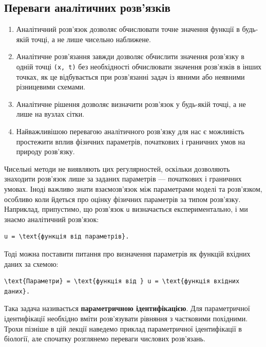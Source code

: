 \documentclass[
  ukrainian,
]{article}
\begin{document}
\subsection{Переваги аналітичних
розв'язків}\label{ux43fux435ux440ux435ux432ux430ux433ux438-ux430ux43dux430ux43bux456ux442ux438ux447ux43dux438ux445-ux440ux43eux437ux432ux44fux437ux43aux456ux432}

\begin{enumerate}
\def\labelenumi{\arabic{enumi}.}
\item
  Аналітичний розв'язок дозволяє обчислювати точне значення функції в
  будь-якій точці, а не лише чисельно наближене.
\item
  Аналітичне розв'язання завжди дозволяє обчислити значення розв'язку в
  одній точці \texttt{(x,\ t)} без необхідності обчислювати значення
  розв'язків в інших точках, як це відбувається при розв'язанні задач із
  явними або неявними різницевими схемами.
\item
  Аналітичне рішення дозволяє визначити розв'язок у будь-якій точці, а
  не лише на вузлах сітки.
\item
  Найважливішою перевагою аналітичного розв'язку для нас є можливість
  простежити вплив фізичних параметрів, початкових і граничних умов на
  природу розв'язку.
\end{enumerate}

Чисельні методи не виявляють цих регулярностей, оскільки дозволяють
знаходити розв'язок лише за заданих параметрів --- початкових і
граничних умовах. Іноді важливо знати взаємозв'язок між параметрами
моделі та розв'язком, особливо коли йдеться про оцінку фізичних
параметрів за типом розв'язку. Наприклад, припустимо, що розв'язок
\texttt{u} визначається експериментально, і ми знаємо аналітичний
розв'язок:

\begin{verbatim}
u = \text{функція від параметрів}.
\end{verbatim}

Тоді можна поставити питання про визначення параметрів як функцій
вхідних даних за схемою:

\begin{verbatim}
\text{Параметри} = \text{функція від } u = \text{функція вхідних даних}.
\end{verbatim}

Така задача називається \textbf{параметричною ідентифікацією}. Для
параметричної ідентифікації необхідно вміти розв'язувати рівняння з
частковими похідними. Трохи пізніше в цій лекції наведемо приклад
параметричної ідентифікації в біології, але спочатку розглянемо переваги
числових розв'язань.
\end{document}
